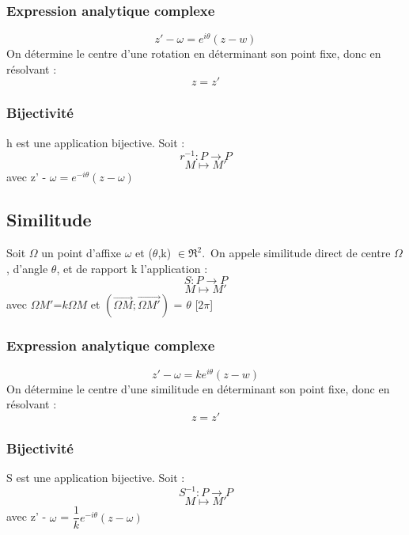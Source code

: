 \subsubsection{Expression analytique complexe}
$$z' - \omega = e^{i\theta}(z-w)$$
On détermine le centre d'une rotation en déterminant son point fixe, donc en résolvant :
$$z = z'$$
\subsubsection{Bijectivité}
h est une application bijective. Soit :
$$r^{-1} : P \rightarrow P$$
$$M \mapsto M'$$
avec z' - $\omega = e^{-i\theta}(z - \omega)$
\subsection{Similitude}
\begin{de}
Soit $\Omega$ un point d'affixe $\omega$ et ($\theta$,k) $\in \Re^2$.\
On appele similitude direct de centre $\Omega$, d'angle $\theta$, et de rapport k l'application :
$$S : P \rightarrow P$$
$$ M \mapsto M'$$
avec $\Omega M'$=$k\Omega M$ et $(\overrightarrow{\Omega M};\overrightarrow{\Omega M'})$ = $\theta$ [$2\pi$]
\end{de}
\subsubsection{Expression analytique complexe}
$$z' - \omega  = ke^{i\theta}(z-w)$$
On détermine le centre d'une similitude en déterminant son point fixe, donc en résolvant :
$$z = z'$$
\subsubsection{Bijectivité}
S est une application bijective. Soit :
$$S^{-1} : P \rightarrow P$$
$$M \mapsto M'$$
avec z' - $\omega$ = $\dfrac{1}{k}e^{-i\theta}(z - \omega)$
